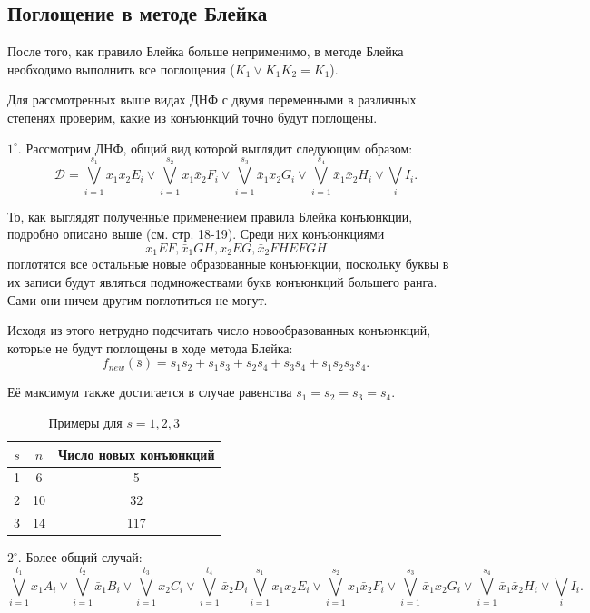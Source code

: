\documentclass[12pt,a4paper,oneside,fleqn,leqno]{article}
\theoremstyle{definition}
\begin{document}
		\subsection{Поглощение в методе Блейка}
			После того, как правило Блейка больше неприменимо, в методе Блейка необходимо выполнить все поглощения ($K_1 \vee K_1K_2 = K_1$).\par
			Для рассмотренных выше видах ДНФ с двумя переменными в различных степенях проверим, какие из конъюнкций точно будут поглощены.\par
			$1^{\circ}.$ Рассмотрим ДНФ, общий вид которой выглядит следующим образом:
			$$
				\mathcal{D} = \bigvee_{i = 1}^{s_1}x_1x_2E_i \vee \bigvee_{i = 1}^{s_2}x_1\bar{x}_2F_i \vee \bigvee_{i = 1}^{s_3}\bar{x}_1x_2G_i \vee \bigvee_{i = 1}^{s_4}\bar{x}_1\bar{x}_2H_i \vee \bigvee_iI_i.
			$$\par
			То, как выглядят полученные применением правила Блейка конъюнкции, подробно описано выше (см. стр. 18-19). Среди них конъюнкциями
			$$x_1EF, \bar{x}_1GH, x_2EG, \bar{x}_2FH EFGH$$
			поглотятся все остальные новые образованные конъюнкции, поскольку буквы в их записи будут являться подмножествами букв конъюнкций большего ранга. Сами они ничем другим поглотиться не могут.\par
			Исходя из этого нетрудно подсчитать число новообразованных конъюнкций, которые не будут поглощены в ходе метода Блейка:
			$$
				f_{new}(\bar{s}) = s_1s_2 + s_1s_3 + s_2s_4 + s_3s_4 + s_1s_2s_3s_4.
			$$\par
			Её максимум также достигается в случае равенства $s_1 = s_2 = s_3 = s_4.$
\par
			\begin{table}[H]
				\centering
				\begin{tabular}{|c|c|c|}
					\hline
					$s$ & $n$ & Число новых конъюнкций\\
					\hline
					1 & 6 & 5\\
					\hline
					2 & 10 & 32\\
					\hline
					3 & 14 & 117\\
					\hline
				\end{tabular}
				\caption*{Примеры для $s = 1, 2, 3$}
			\end{table}\par
			$2^{\circ}.$ Более общий случай:
			$$
				\bigvee_{i = 1}^{t_1}x_1A_i \vee \bigvee_{i = 1}^{t_2}\bar{x}_1B_i \vee \bigvee_{i = 1}^{t_3}x_2C_i \vee \bigvee_{i = 1}^{t_4}\bar{x}_2D_i \bigvee_{i = 1}^{s_1}x_1x_2E_i \vee \bigvee_{i = 1}^{s_2}x_1\bar{x}_2F_i \vee \bigvee_{i = 1}^{s_3}\bar{x}_1x_2G_i \vee \bigvee_{i = 1}^{s_4}\bar{x}_1\bar{x}_2H_i \vee \bigvee_iI_i.
			$$\par
\end{document}
